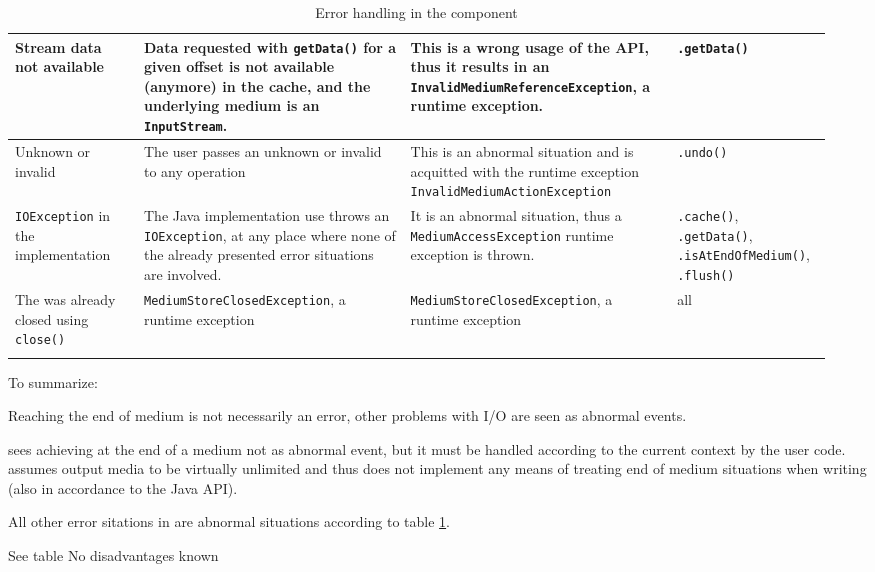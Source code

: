 \begin{landscape}
\begin{longtable}{|p{0.15\linewidth}|p{0.31\linewidth}|p{0.31\linewidth}|p{0.18\linewidth}|}
\hline
Stream data not available & Data requested with \texttt{getData()} for a given offset is not available (anymore) in the cache, and the underlying medium is an \texttt{InputStream}. & This is a wrong usage of the API, thus it results in an \texttt{InvalidMediumReferenceException}, a runtime exception. & \IMediumStore{} \texttt{.getData()} \\
\hline
Unknown or invalid \MediumAction{} & The user passes an unknown or invalid \MediumAction{} to any operation & This is an abnormal situation and is acquitted with the runtime exception \texttt{InvalidMediumActionException}  & \IMediumStore{}\texttt{.undo()} \\
\hline
\texttt{IOException} in the implementation & The Java implementation use throws an \texttt{IOException}, at any place where none of the already presented error situations are involved. & It is an abnormal situation, thus a \texttt{MediumAccessException} runtime exception is thrown. & \IMediumStore{} \texttt{.cache()}, \IMediumStore{} \texttt{.getData()}, \IMediumStore{} \texttt{.isAtEndOfMedium()}, \IMediumStore{} \texttt{.flush()} \\
\hline
The \IMediumStore{} was already closed using \texttt{close()} & \texttt{MediumStoreClosedException}, a runtime exception & \texttt{MediumStoreClosedException}, a runtime exception & all \\
\hline
\caption{Error handling in the component \COMPmedia{}}
\label{tab:FBMedia}
\end{longtable}
\end{landscape}

To summarize:

{%
Reaching the end of medium is not necessarily an error, other problems with I/O are seen as abnormal events.
}
{%
\COMPmedia{} sees achieving at the end of a medium not as abnormal event, but it must be handled according to the current context by the user code. \LibName{} assumes output media to be virtually unlimited and thus does not implement any means of treating end of medium situations when writing (also in accordance to the Java API).

All other error sitations in \COMPmedia{} are abnormal situations according to table \hyperref[tab:FBMedia]{\ref{tab:FBMedia}}.
}
{%
See table
}
{%
No disadvantages known
}


